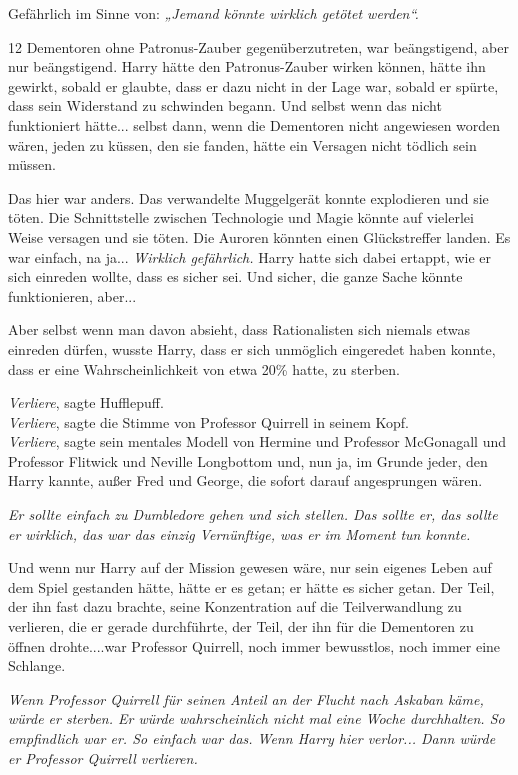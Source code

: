 {Gefährlich im Sinne von: \emph{„Jemand könnte wirklich getötet werden“.}

12 Dementoren ohne Patronus-Zauber gegenüberzutreten, war beängstigend, aber nur beängstigend. Harry hätte den Patronus-Zauber wirken können, hätte ihn gewirkt, sobald er glaubte, dass er dazu nicht in der Lage war, sobald er spürte, dass sein Widerstand zu schwinden begann. Und selbst wenn das nicht funktioniert hätte... selbst dann, wenn die Dementoren nicht angewiesen worden wären, jeden zu küssen, den sie fanden, hätte ein Versagen nicht tödlich sein müssen.

Das hier war anders. Das verwandelte Muggelgerät konnte explodieren und sie töten. Die Schnittstelle zwischen Technologie und Magie könnte auf vielerlei Weise versagen und sie töten. Die Auroren könnten einen Glückstreffer landen. Es war einfach, na ja... \emph{Wirklich gefährlich.} Harry hatte sich dabei ertappt, wie er sich einreden wollte, dass es sicher sei. Und sicher, die ganze Sache könnte funktionieren, aber...

Aber selbst wenn man davon absieht, dass Rationalisten sich niemals etwas einreden dürfen, wusste Harry, dass er sich unmöglich eingeredet haben konnte, dass er eine Wahrscheinlichkeit von etwa 20\% hatte, zu sterben.

\emph{Verliere}, sagte Hufflepuff.\\ \emph{Verliere}, sagte die Stimme von Professor Quirrell in seinem Kopf.\\ \emph{Verliere}, sagte sein mentales Modell von Hermine und Professor McGonagall und Professor Flitwick und Neville Longbottom und, nun ja, im Grunde jeder, den Harry kannte, außer Fred und George, die sofort darauf angesprungen wären.

\emph{Er sollte einfach zu Dumbledore gehen und sich stellen. Das sollte er, das sollte er wirklich, das war das einzig Vernünftige, was er im Moment tun konnte.}

Und wenn nur Harry auf der Mission gewesen wäre, nur sein eigenes Leben auf dem Spiel gestanden hätte, hätte er es getan; er hätte es sicher getan. Der Teil, der ihn fast dazu brachte, seine Konzentration auf die Teilverwandlung zu verlieren, die er gerade durchführte, der Teil, der ihn für die Dementoren zu öffnen drohte....war Professor Quirrell, noch immer bewusstlos, noch immer eine Schlange.

\emph{Wenn Professor Quirrell für seinen Anteil an der Flucht nach Askaban käme, würde er sterben. Er würde wahrscheinlich nicht mal eine Woche durchhalten. So empfindlich war er. So einfach war das. Wenn Harry hier verlor... Dann würde er Professor Quirrell verlieren.}

}

